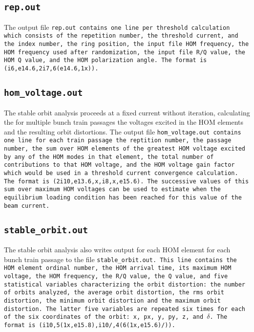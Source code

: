 \documentclass[11pt]{article}
\begin{document}
{\subsection{\tt{rep.out}}
The output file \tt{rep.out} contains one line per threshold calculation which
consists of the repetition number, the threshold current, and the index number, the 
ring position, the input file HOM frequency, the HOM frequency used after randomization,
the input file \tt{R/Q} value, the HOM Q value, and the HOM polarization angle.
The format is \tt{(i6,e14.6,2i7,6(e14.6,1x))}.
\subsection{\tt{hom_voltage.out}}
The stable orbit analysis proceeds at a fixed current without iteration, calculating
the for multiple bunch train passages the voltages excited in the HOM elements and
the resulting orbit distortions. The output file \tt{hom_voltage.out} contains one
line for each train passage the reptition number, the passage number, the sum over HOM
elements of the greatest HOM voltage excited by any of the HOM modes in that element,
the total number of contributions to that HOM voltage, and the HOM voltage gain factor which
would be used in a threshold current convergence calculation.
The format is \tt{(2i10,e13.6,x,i8,x,e15.6)}. The successive values of this sum over
maximum HOM voltages can be used to estimate when the equilibrium loading condition has
been reached for this value of the beam current.
\subsection{\tt{stable_orbit.out}}
The stable orbit analysis also writes output for each HOM element for each bunch train passage to
the file \tt{stable_orbit.out}. This line contains the HOM element ordinal number, the HOM
arrival time, its maximum HOM voltage, the HOM frequency, the \tt{R/Q} value, the Q value, and five
statistical variables characterizing the orbit distortion: the number of orbits analyzed, the average orbit distortion, the rms orbit distortion, the minimum orbit distortion and the maximum orbit distortion. The latter five variables are repeated six times for each of the six coordinates of the orbit: x, px, y, py, z, and ${\delta}$. The format is \tt{(i10,5(1x,e15.8),i10/,4(6(1x,e15.6)/))}.
}
\end{document}
